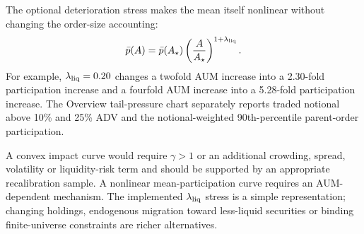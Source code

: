 \documentclass[11pt,a4paper]{article}
\numberwithin{equation}{section}
\begin{document}
The optional deterioration stress makes the mean itself nonlinear without changing the order-size
accounting:
\begin{equation}\label{eq:stressedparticipation}
 \bar p(A)=\bar p(A_\star)
 \left(\frac{A}{A_\star}\right)^{1+\lambda_{\rm liq}}.
\end{equation}
For example, $\lambda_{\rm liq}=0.20$ changes a twofold AUM increase into a 2.30-fold
participation increase and a fourfold AUM increase into a 5.28-fold participation increase.
The Overview tail-pressure chart separately reports traded notional above 10\% and 25\% ADV and
the notional-weighted 90th-percentile parent-order participation.

A convex impact curve would require $\gamma>1$ or an additional crowding, spread, volatility or
liquidity-risk term and should be supported by an appropriate recalibration sample. A nonlinear
mean-participation curve requires an AUM-dependent mechanism. The implemented
$\lambda_{\rm liq}$ stress is a simple representation; changing holdings, endogenous migration
toward less-liquid securities or binding finite-universe constraints are richer alternatives.

\small
\end{document}
